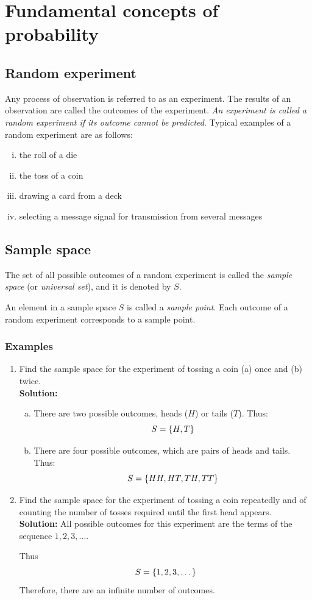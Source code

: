 \section{Fundamental concepts of probability}
	
	\subsection{Random experiment}
		Any process of observation is referred to as an experiment. The results of an observation are called the outcomes of the experiment. \emph{An experiment is called a random experiment if its outcome cannot be predicted}. Typical examples of a random experiment are as follows:
		\begin{enumerate}[i.]
			\item the roll of a die
			\item the toss of a coin
			\item drawing a card from a deck
			\item selecting a message signal for transmission from several messages
		\end{enumerate}
		
	\subsection{Sample space}
		The set of all possible outcomes of a random experiment is called the \emph{sample space} (or \emph{universal set}), and it is denoted by $S$.
		
		An element in a sample space $S$ is called a \emph{sample point}. Each outcome of a random experiment corresponds to a
		sample point.
		
		\subsubsection*{Examples}
			\begin{enumerate}
				\item Find the sample space for the experiment of tossing a coin (a) once and (b) twice.\\
				\textbf{Solution:}
				\begin{enumerate}[(a)]
					\item There are two possible outcomes, heads ($H$) or tails ($T$). Thus:
					$$S=\qty{H,T}$$
					
					\item There are four possible outcomes, which are pairs of heads and tails. Thus:
					$$S=\qty{HH,HT,TH,TT}$$
				\end{enumerate}
				
				\item Find the sample space for the experiment of tossing a coin repeatedly and of counting the number of tosses required until the first head appears.\\
				\textbf{Solution:} All possible outcomes for this experiment are the terms of the sequence $1,2,3,\dots$.
				
				Thus
				$$S=\qty{1,2,3,\dots}$$
				Therefore, there are an infinite number of outcomes.
			\end{enumerate}
			
